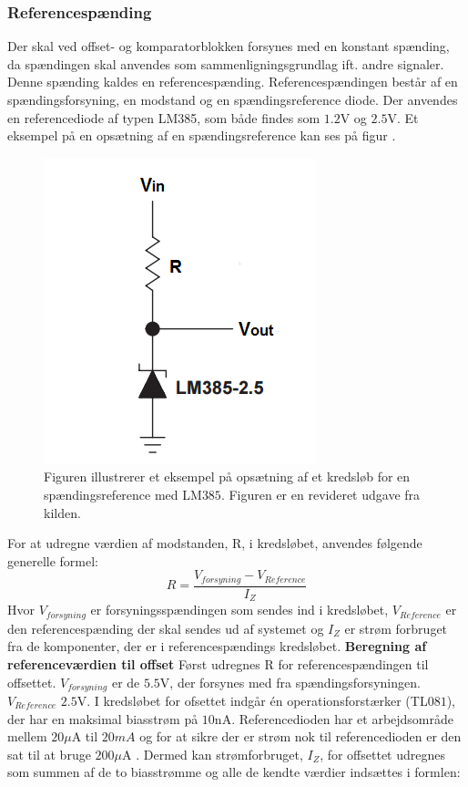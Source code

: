 \subsubsection{Referencespænding}\label{Spaendingsref}
Der skal ved offset- og komparatorblokken forsynes med en konstant spænding, da spændingen skal anvendes som sammenligningsgrundlag ift. andre signaler. Denne spænding kaldes en referencespænding. Referencespændingen består af en spændingsforsyning, en modstand og en spændingsreference diode. Der anvendes en referencediode af typen LM385, som både findes som $1.2$V og $2.5$V. Et eksempel på en opsætning af en spændingsreference kan ses på figur .

\begin{figure}[H]
	\centering
	\includegraphics[scale=1.0]{figures/cProblemloesning/ReferenceEksempel}
	\caption{Figuren illustrerer et eksempel på opsætning af et kredsløb for en spændingsreference med LM$385$. Figuren er en revideret udgave fra kilden. \cite{Instruments2005}}
	\label{fig:Spaendingsreference}
\end{figure}

For at udregne værdien af modstanden, R, i kredsløbet, anvendes følgende generelle formel:
\begin{equation}
R=\dfrac{V_{forsyning}-V_{Reference}}{I_{Z}}
\end{equation}
Hvor $V_{forsyning}$ er forsyningsspændingen som sendes ind i kredsløbet, $V_{Reference}$ er den referencespænding der skal sendes ud af systemet og $I_{Z}$ er strøm forbruget fra de komponenter, der er i referencespændings kredsløbet. 
\noindent \textbf{Beregning af referenceværdien til offset}
Først udregnes R for referencespændingen til offsettet. $V_{forsyning}$ er de $5.5$V, der forsynes med fra spændingsforsyningen. $V_{Reference}$ $2.5$V. I kredsløbet for ofsettet indgår én operationsforstærker (TL$081$), der har en maksimal biasstrøm på $10$nA\cite{Corporation1995}. Referencedioden har et arbejdsområde mellem $20\mu$A til $20mA$ og for at sikre der er strøm nok til referencedioden er den sat til at bruge $200\mu$A \cite{Instruments2005}. Dermed kan strømforbruget, $I_{Z}$, for offsettet udregnes som summen af de to biasstrømme og alle de kendte værdier indsættes i formlen:

